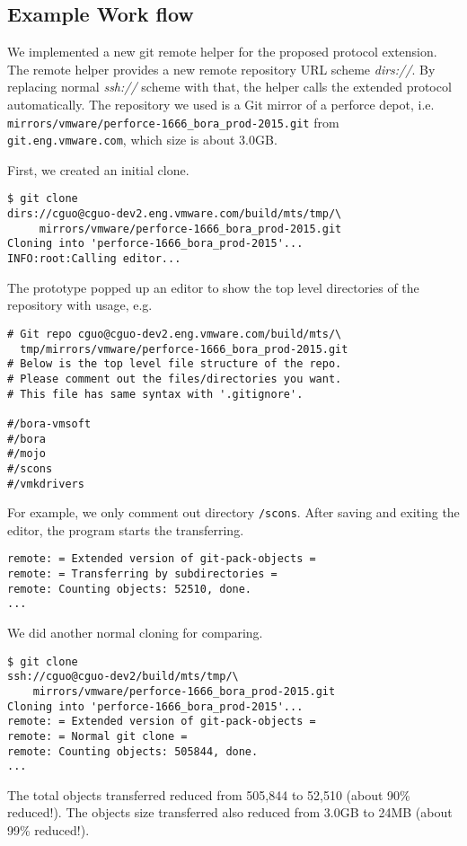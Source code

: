 \documentclass[preprint]{sigplanconf}
\begin{document}
\subsection{Example Work flow}
We implemented a new git remote helper\cite{git-remote-helper} for the proposed
protocol extension.
The remote helper provides a new remote repository URL scheme \emph{dirs://}.
By replacing normal \emph{ssh://} scheme with that, the helper calls the
extended protocol automatically.
The repository we used is a Git mirror of a perforce depot, i.e.\\
\verb|mirrors/vmware/perforce-1666_bora_prod-2015.git| from
\verb|git.eng.vmware.com|, which size is about 3.0GB.

First, we created an initial clone.
\begin{verbatim}
$ git clone
dirs://cguo@cguo-dev2.eng.vmware.com/build/mts/tmp/\
     mirrors/vmware/perforce-1666_bora_prod-2015.git
Cloning into 'perforce-1666_bora_prod-2015'...
INFO:root:Calling editor...
\end{verbatim}
The prototype popped up an editor to show the top level directories of the
repository with usage, e.g.
\begin{verbatim}
# Git repo cguo@cguo-dev2.eng.vmware.com/build/mts/\
  tmp/mirrors/vmware/perforce-1666_bora_prod-2015.git
# Below is the top level file structure of the repo.
# Please comment out the files/directories you want.
# This file has same syntax with '.gitignore'.

#/bora-vmsoft
#/bora
#/mojo
#/scons
#/vmkdrivers
\end{verbatim}

For example, we only comment out directory \verb|/scons|.
After saving and exiting the editor, the program starts the transferring.
\begin{verbatim}
remote: = Extended version of git-pack-objects =
remote: = Transferring by subdirectories =
remote: Counting objects: 52510, done.
...
\end{verbatim}

We did another normal cloning for comparing.
\begin{verbatim}
$ git clone
ssh://cguo@cguo-dev2/build/mts/tmp/\
    mirrors/vmware/perforce-1666_bora_prod-2015.git
Cloning into 'perforce-1666_bora_prod-2015'...
remote: = Extended version of git-pack-objects =
remote: = Normal git clone =
remote: Counting objects: 505844, done.
...
\end{verbatim}
The total objects transferred reduced from 505,844 to 52,510 (about 90\%
reduced!).
The objects size transferred also reduced from 3.0GB to 24MB (about 99\%
reduced!).
\end{document}
